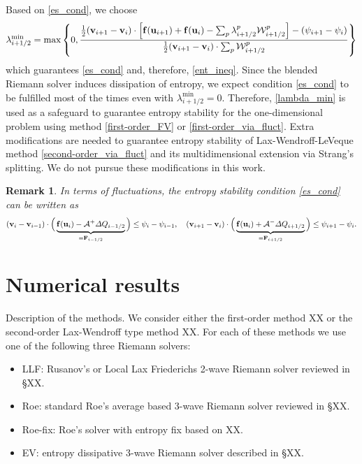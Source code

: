 \documentclass[preprint, 11pt]{article}
\newcommand{\W}{{\mathcal W}}
\newcommand{\A}{{\mathcal A}}
\newcommand{\bff}{{\bf f}}
\newcommand{\bfF}{{\bf F}}
\newcommand{\bfu}{{\bf u}}
\newcommand{\bfv}{{\bf v}}
\newtheorem{remark}{Remark}
\begin{document}
Based on \eqref{es_cond}, we choose
\begin{align}\label{lambda_min}
  \lambda_{i+1/2}^{\min} = \max\left\{0,\frac{\frac{1}{2}(\bfv_{i+1}-\bfv_{i})\cdot\left[\bff(\bfu_{i+1})+\bff(\bfu_{i})-\sum_p\lambda_{i+1/2}^p\W_{i+1/2}^p\right]-(\psi_{i+1}-\psi_i)}{\frac{1}{2}(\bfv_{i+1}-\bfv_{i})\cdot\sum_p\W_{i+1/2}^p}\right\}
\end{align}
which guarantees \eqref{es_cond} and, therefore, \eqref{ent_ineq}. 
Since the blended Riemann solver induces dissipation of entropy, 
we expect condition \eqref{es_cond} to be fulfilled most of the times even with $\lambda_{i+1/2}^{\min}=0$. 
Therefore, \eqref{lambda_min} is used as a safeguard to guarantee entropy stability
for the one-dimensional problem using method \eqref{first-order_FV} or \eqref{first-order_via_fluct}. 
Extra modifications are needed to guarantee entropy stability of Lax-Wendroff-LeVeque method 
\eqref{second-order_via_fluct} and its multidimensional extension via Strang's splitting. 
We do not pursue these modifications in this work. 

\begin{remark}
In terms of fluctuations, the entropy stability condition \eqref{es_cond} can be written as 
\begin{align*}
  (\bfv_{i}-\bfv_{i-1})\cdot 
  \Big(
  \underbrace{\bff(\bfu_i)-\A^+\Delta Q_{i-1/2}}_{=\bfF_{i-1/2}}\Big)\leq \psi_{i}-\psi_{i-1},
  \quad
  (\bfv_{i+1}-\bfv_i)\cdot 
  \Big(\underbrace{\bff(\bfu_i)+\A^-\Delta Q_{i+1/2}}_{=\bfF_{i+1/2}}\Big)\leq \psi_{i+1}-\psi_i.
\end{align*}
\end{remark}



\clearpage
\section{Numerical results}\label{sec:num}
Description of the methods. We consider either the first-order method XX or the second-order Lax-Wendroff
type method XX. For each of these methods we use one of the following three Riemann solvers: 
\begin{itemize}
  \item LLF: Rusanov's or Local Lax Friederichs 2-wave Riemann solver reviewed in \S XX.
  \item Roe: standard Roe's average based 3-wave Riemann solver reviewed in \S XX. 
  \item Roe-fix: Roe's solver with entropy fix based on XX. 
  \item EV:  entropy dissipative 3-wave Riemann solver described in \S XX.
\end{itemize}
\end{document}
